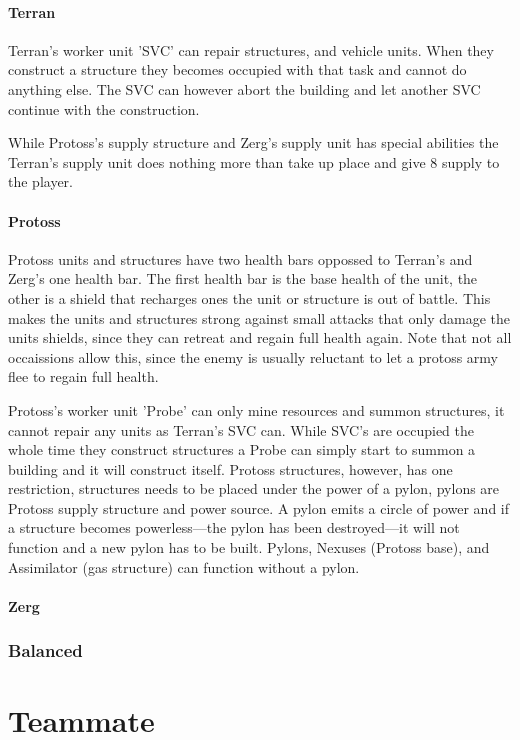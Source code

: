 \paragraph{Terran}
Terran's worker unit 'SVC' can repair structures, and vehicle units. When they construct a structure they becomes occupied with that task and cannot do anything else. The SVC can however abort the building and let another SVC continue with the construction.

While Protoss's supply structure and Zerg's supply unit has special abilities the Terran's supply unit does nothing more than take up place and give 8 supply to the player.

\paragraph{Protoss}
Protoss units and structures have two health bars oppossed to Terran's and Zerg's one health bar. The first health bar is the base health of the unit, the other is a shield that recharges ones the unit or structure is out of battle. This makes the units and structures strong against small attacks that only damage the units shields, since they can retreat and regain full health again. Note that not all occaissions allow this, since the enemy is usually reluctant to let a protoss army flee to regain full health.

Protoss's worker unit 'Probe' can only mine resources and summon structures, it cannot repair any units as Terran's SVC can. While SVC's are occupied the whole time they construct structures a Probe can simply start to summon a building and it will construct itself. Protoss structures, however, has one restriction, structures needs to be placed under the power of a pylon, pylons are Protoss supply structure and power source. A pylon emits a circle of power and if a structure becomes powerless—the pylon has been destroyed—it will not function and a new pylon has to be built. Pylons, Nexuses (Protoss base), and Assimilator (gas structure) can function without a pylon.

\paragraph{Zerg}

\subsubsection{Balanced}

\section{Teammate}

